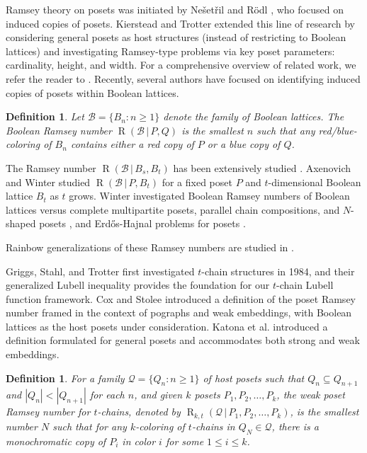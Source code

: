 \documentclass[twoside,12pt]{article}
\newtheorem{definition}[theorem]{Definition}
\begin{document}
Ramsey theory on posets was initiated by Ne\v{s}et\v{r}il and R\"{o}dl \cite{NesetrilRodl}, who focused on induced copies of posets. Kierstead and Trotter \cite{KiersteadTrotter} extended this line of research by considering general posets as host structures (instead of restricting to Boolean lattices) and investigating Ramsey-type problems via key poset parameters: cardinality, height, and width. For a comprehensive overview of related work, we refer the reader to \cite{DKT91, KiersteadTrotter, McColm, TrotterRamsey}. Recently, several authors \cite{AW17, CS18, GundersonRodlSidorenko, JohnstonLuMilans, LT22} have focused on identifying induced copies of posets within Boolean lattices.

\begin{definition}\label{def-BRn}
Let $\mathcal{B} = \{B_n : n \geq 1\}$ denote the family of Boolean lattices. The \textit{Boolean Ramsey number} $\operatorname{R}(\mathcal{B}\,|\,P, Q)$ is the smallest $n$ such that any red/blue-coloring of $B_n$ contains either a red copy of $P$ or a blue copy of $Q$.
\end{definition}

The Ramsey number $\operatorname{R}(\mathcal{B}\,|\,B_s, B_t)$ has been extensively studied \cite{AW17, LT22, CS18, GMT23, BP2021, Walzer15}. Axenovich and Winter \cite{AW23} studied $\operatorname{R}(\mathcal{B}\,|\, P, B_t)$ for a fixed poset $P$ and $t$-dimensional Boolean lattice $B_t$ as $t$ grows. Winter investigated Boolean Ramsey numbers of Boolean lattices versus complete multipartite posets, parallel chain compositions, and $N$-shaped posets \cite{Winter23, WinterIII, WinterII}, and Erdős-Hajnal problems for posets \cite{Winter25}.

Rainbow generalizations of these Ramsey numbers are studied in \cite{CGLMNPV22, CCLL20, Patkos20}.

Griggs, Stahl, and Trotter \cite{GST84} first investigated $t$-chain structures in 1984, and their generalized Lubell inequality provides the foundation for our $t$-chain Lubell function framework.
Cox and Stolee \cite{CS18} introduced a definition of the poset Ramsey number framed in the context of pographs and weak embeddings, with Boolean lattices as the host posets under consideration. Katona et al. \cite{KMOW25} introduced a definition formulated for general posets and accommodates both strong and weak embeddings.

\begin{definition}\label{Defi-Wposet}
For a family $\mathcal{Q}=\{Q_{n} : n\geq 1\}$ of host posets
such that $Q_n \subseteq Q_{n+1}$ and $|Q_n|<|Q_{n+1}|$ for each $n$,
and given $k$ posets $P_1,P_2,\ldots,P_k$,
the \emph{weak poset Ramsey number
for $t$-chains},
denoted by $\operatorname{R}_{k,t}(\mathcal{Q}\,|\,P_1,P_2,\ldots,P_k)$,
is the smallest number $N$
such that for any $k$-coloring of $t$-chains in $Q_N \in \mathcal{Q}$,
there is a monochromatic copy of $P_i$ in color $i$ for some $1\leq i\leq k$.
\end{definition}
\end{document}
